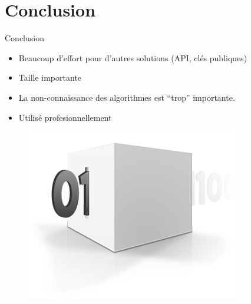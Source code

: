 \documentclass{beamer}
\begin{document}
\section{Conclusion}

\begin{frame}{Conclusion}
  
  \begin{itemize}
  \item Beaucoup d'effort pour d'autres solutions (API, clés publiques)
  \item Taille importante
  \item La non-connaissance des algorithmes est ``trop'' importante.
  \item Utilisé profesionnellement
  \end{itemize}

  \begin{figure}[h]
    \centering
    \includegraphics[scale=0.6]{./images/conclusion.png}
  \end{figure}

\end{frame}
\end{document}
